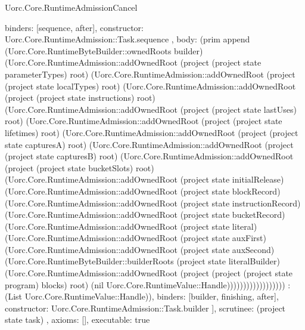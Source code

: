 \begin{lexlean}{Uorc.Core.RuntimeAdmissionCancel}
\begin{semanticmodule}
{{{        binders: [sequence, after],
        constructor: Uorc.Core.RuntimeAdmission::Task.sequence
      },
      {
        body: (prim append (Uorc.Core.RuntimeByteBuilder::ownedRoots builder) (Uorc.Core.RuntimeAdmission::addOwnedRoot (project (project state parameterTypes) root) (Uorc.Core.RuntimeAdmission::addOwnedRoot (project (project state localTypes) root) (Uorc.Core.RuntimeAdmission::addOwnedRoot (project (project state instructions) root) (Uorc.Core.RuntimeAdmission::addOwnedRoot (project (project state lastUses) root) (Uorc.Core.RuntimeAdmission::addOwnedRoot (project (project state lifetimes) root) (Uorc.Core.RuntimeAdmission::addOwnedRoot (project (project state capturesA) root) (Uorc.Core.RuntimeAdmission::addOwnedRoot (project (project state capturesB) root) (Uorc.Core.RuntimeAdmission::addOwnedRoot (project (project state bucketSlots) root) (Uorc.Core.RuntimeAdmission::addOwnedRoot (project state initialRelease) (Uorc.Core.RuntimeAdmission::addOwnedRoot (project state blockRecord) (Uorc.Core.RuntimeAdmission::addOwnedRoot (project state instructionRecord) (Uorc.Core.RuntimeAdmission::addOwnedRoot (project state bucketRecord) (Uorc.Core.RuntimeAdmission::addOwnedRoot (project state literal) (Uorc.Core.RuntimeAdmission::addOwnedRoot (project state auxFirst) (Uorc.Core.RuntimeAdmission::addOwnedRoot (project state auxSecond) (Uorc.Core.RuntimeByteBuilder::builderRoots (project state literalBuilder) (Uorc.Core.RuntimeAdmission::addOwnedRoot (project (project (project state program) blocks) root) (nil Uorc.Core.RuntimeValue::Handle)))))))))))))))))) : (List Uorc.Core.RuntimeValue::Handle)),
        binders: [builder, finishing, after],
        constructor: Uorc.Core.RuntimeAdmission::Task.builder
      }
    ],
    scrutinee: (project state task)
  },
  axioms: [],
  executable: true
}


\end{semanticmodule}
\end{lexlean}
